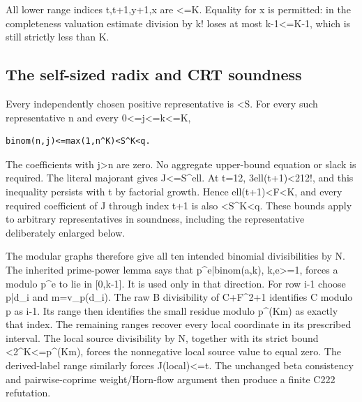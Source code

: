 All lower range indices t,t+\allowbreak{}1,y+\allowbreak{}1,x are \textless{}\allowbreak{}=\allowbreak{}K. Equality for x is permitted: in the completeness valuation estimate division by k! loses at most k-1\textless{}\allowbreak{}=\allowbreak{}K-1, which is still strictly less than K.



\subsection{The self-sized radix and CRT soundness}



Every independently chosen positive representative is \textless{}\allowbreak{}S. For every such representative n and every 0\textless{}\allowbreak{}=\allowbreak{}j\textless{}\allowbreak{}=\allowbreak{}k\textless{}\allowbreak{}=\allowbreak{}K,



\begin{verbatim}
binom(n,j)<=max(1,n^K)<S^K<q.
\end{verbatim}

The coefficients with j\textgreater{}\allowbreak{}n are zero. No aggregate upper-bound equation or slack is required. The literal majorant gives J\textless{}\allowbreak{}=\allowbreak{}S\textasciicircum{}\allowbreak{}ell. At t=\allowbreak{}12, 3ell(t+\allowbreak{}1)\textless{}\allowbreak{}2\textasteriskcentered{}\allowbreak{}12!, and this inequality persists with t by factorial growth. Hence ell(t+\allowbreak{}1)\textless{}\allowbreak{}F\textless{}\allowbreak{}K, and every required coefficient of J through index t+\allowbreak{}1 is also \textless{}\allowbreak{}S\textasciicircum{}\allowbreak{}K\textless{}\allowbreak{}q. These bounds apply to arbitrary representatives in soundness, including the representative deliberately enlarged below.



The modular graphs therefore give all ten intended binomial divisibilities by N. The inherited prime-power lemma says that p\textasciicircum{}\allowbreak{}e|binom(a,k), k,e\textgreater{}\allowbreak{}=\allowbreak{}1, forces a modulo p\textasciicircum{}\allowbreak{}e to lie in [0,k-1]. It is used only in that direction. For row i-1 choose p|d\_\allowbreak{}i and m=\allowbreak{}v\_\allowbreak{}p(d\_\allowbreak{}i). The raw B divisibility of C+\allowbreak{}F\textasciicircum{}\allowbreak{}2+\allowbreak{}1 identifies C modulo p as i-1. Its range then identifies the small residue modulo p\textasciicircum{}\allowbreak{}(Km) as exactly that index. The remaining ranges recover every local coordinate in its prescribed interval. The local source divisibility by N, together with its strict bound \textless{}\allowbreak{}2\textasciicircum{}\allowbreak{}K\textless{}\allowbreak{}=\allowbreak{}p\textasciicircum{}\allowbreak{}(Km), forces the nonnegative local source value to equal zero. The derived-label range similarly forces J(local)\textless{}\allowbreak{}=\allowbreak{}t. The unchanged beta consistency and pairwise-coprime weight/\allowbreak{}Horn-flow argument then produce a finite C222 refutation.



